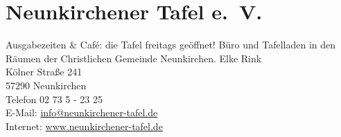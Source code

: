 \section{Neunkirchener Tafel e.~V.}
Ausgabezeiten \& Café: die Tafel freitags geöffnet! Büro und Tafelladen in den Räumen der Christlichen Gemeinde Neunkirchen.
Elke Rink\\
Kölner Straße 241 \\
57290 Neunkirchen \\
Telefon 02 73 5 - 23 25 \\ 
E-Mail: \href{mailto:info@neunkirchener-tafel.de}{info@neunkirchener-tafel.de}\\
Internet: \href{www.neunkirchener-tafel.de}{www.neunkirchener-tafel.de}